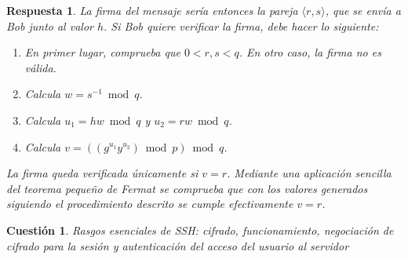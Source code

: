\documentclass[
  a4paper,
  spanish,
  12pt,
]{scrartcl}
\theoremstyle{ejercicio-style}
\newtheorem{ejer}{Cuestión}
\theoremstyle{remark-style}
\newtheorem*{sol}{Respuesta}
\theoremstyle{teorema-style}
\begin{document}
\begin{sol}
  La firma del mensaje sería entonces la pareja $\langle r, s \rangle$, que se envía a Bob junto al valor $h$. Si Bob quiere verificar la firma, debe hacer lo siguiente:
  \begin{enumerate}
      \item En primer lugar, comprueba que $0 < r, s < q$. En otro caso, la firma no es válida.
      \item Calcula $w=s^{-1} \bmod q$.
      \item Calcula $u_1 = hw \bmod q$ y $u_2 = rw \bmod q$.
      \item Calcula $v = ((g^{u_1}y^{u_2}) \bmod p) \bmod q$.
  \end{enumerate}

  La firma queda verificada únicamente si $v=r$. Mediante una aplicación sencilla del \textit{teorema pequeño de Fermat} se comprueba que con los valores generados siguiendo el procedimiento descrito se cumple efectivamente $v=r$.
\end{sol}

\begin{ejer}
  Rasgos esenciales de SSH: cifrado, funcionamiento, negociación de cifrado para la sesión y autenticación del acceso del usuario al servidor
\end{ejer}
\end{document}
